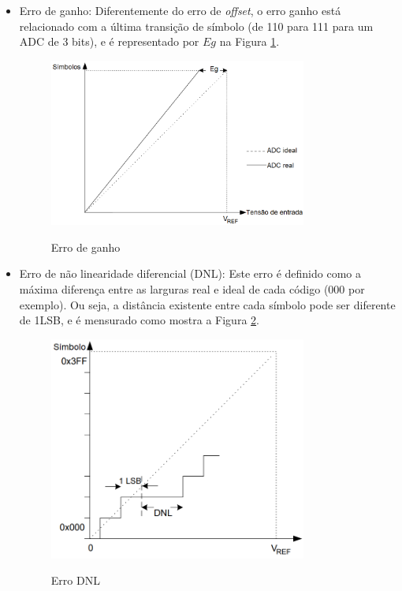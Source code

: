 \documentclass[oneside,openright,12pt]{ufsm_2015} %
\begin{document}
\begin{itemize}
    \item Erro de ganho:
    Diferentemente do erro de \textit{offset}, o erro ganho está relacionado com a última transição de símbolo (de 110 para 111 para um ADC de 3 bits), e é representado por $Eg$ na Figura \ref{fig:eg-adc}.
    
    \begin{figure}[ht]
    \caption{\label{exepretex} Erro de ganho}
    \centering
    \includegraphics[width=0.8\textwidth]{figuras/erro_ganho.png}
    \vspace{\baselineskip} %
        \label{fig:eg-adc}
    \end{figure}
    
    \item Erro de não linearidade diferencial (DNL):
    Este erro é definido como a máxima diferença entre as larguras real e ideal de cada código (000 por exemplo). Ou seja, a distância existente entre cada símbolo pode ser diferente de 1LSB, e é mensurado como mostra a Figura \ref{fig:dnl-adc}.
    
    \begin{figure}[H]
    \caption{\label{exepretex} Erro DNL}
    \centering
    \includegraphics[width=0.8\textwidth]{figuras/erro_dnl.png}
    \vspace{\baselineskip} %
        \label{fig:dnl-adc}
    \end{figure}
    

\end{itemize}
\end{document}
